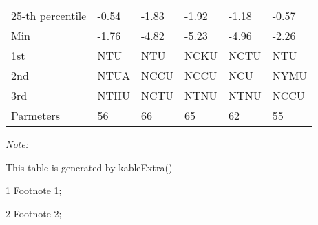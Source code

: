 \begin{table}
\begin{threeparttable}
\begin{tabular}[t]{llllll}
\hspace{1em}25-th percentile & -0.54 & -1.83 & -1.92 & -1.18 & -0.57\\
\hspace{1em}Min & -1.76 & -4.82 & -5.23 & -4.96 & -2.26\\
\hspace{1em}1st & NTU & NTU & NCKU & NCTU & NTU\\
\hspace{1em}2nd & NTUA & NCCU & NCCU & NCU & NYMU\\
\hspace{1em}3rd & NTHU & NCTU & NTNU & NTNU & NCCU\\
Parmeters & 56 & 66 & 65 & 62 & 55\\
\bottomrule
\end{tabular}
\begin{tablenotes}
\item \textit{Note: } 
\item This table is generated by kableExtra()
\item[1] Footnote 1; 
\item[2] Footnote 2; 
\end{tablenotes}
\end{threeparttable}
\end{table}
